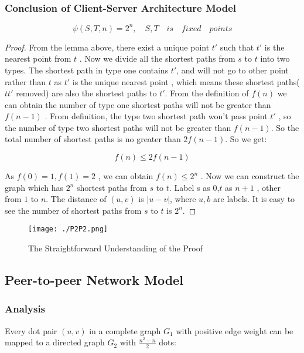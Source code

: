 \documentclass{elegantpaper}
\begin{document}
 \subsubsection {Conclusion of Client-Server Architecture Model}
 \begin{theorem}$$\psi(S,T,n) = 2^n ,\quad S,T \quad is\quad  fixed\quad points$$
 \end{theorem}
 \begin{proof} \quad From the lemma above, there exist a unique point $t'$ such that $t'$ is the nearest point from $t$ . Now we divide all the shortest paths from $s$ to $t$ into two types. The shortest path in type one contains $t'$,  and will not go to other point rather than $t$ as $t'$ is the unique nearest point , which means these shortest paths($tt'$ removed) are also the shortest paths to $t'$. From the definition of  $f(n)$ we can obtain the number of type one shortest paths will not be greater than $f(n-1)$ . From definition, the type two shortest path won't pass point $t'$ , so the number of type two shortest paths will not be greater than $f(n-1)$. So the total number of shortest paths is no greater than $2f(n-1)$. So we get:

                                                                              $$f(n) \leq 2f(n-1)$$

 As $f(0) = 1, f(1) = 2$ , we can obtain $f(n) \leq 2^{n}$ .
 Now we can construct the graph which has $2^{n}$ shortest paths from $s$ to $t$. Label s as $0$,$ t$ as $n+1$ , other from $1$ to
$n$. The distance of $(u,v)$ is $|u-v|$, where $u, b$ are labels. It is easy to see the number of shortest paths from $s$ to $t$ is
$2^{n}$.
\end{proof}
  \begin{figure}[htbp]
	
	\centering
	
	\texttt{[image: ./P2P2.png]}
	
	\caption{The Straightforward Understanding of the Proof}
	
\end{figure}
 
 
 
\subsection{Peer-to-peer Network Model}
\subsubsection{Analysis}
Every dot pair $(u,v)$ in a complete graph $G_{1}$ with positive edge weight can be mapped
to a directed graph $G_{2}$ with $\frac{n^{2}-n}{2}$ dots:
\end{document}
